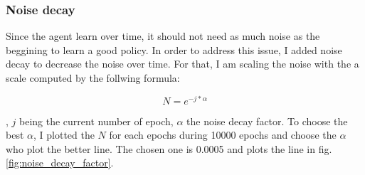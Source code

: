 \documentclass{article}
\begin{document}
\subsubsection{Noise decay}

Since the agent learn over time, it should not need as much noise as the
beggining to learn a good policy. In order to address this issue, I added noise
decay to decrease the noise over time. For that, I am scaling the noise with
the a scale computed by the follwing formula:

\begin{equation}
N = e^{-j * \alpha}
\end{equation}

, $j$ being the current number of epoch, $\alpha$ the noise decay factor. To
choose the best $\alpha$, I plotted the $N$ for each epochs during
10000 epochs and choose the $\alpha$ who plot the better line. The chosen one is
0.0005 and plots the line in fig. \ref{fig:noise_decay_factor}.
\end{document}
